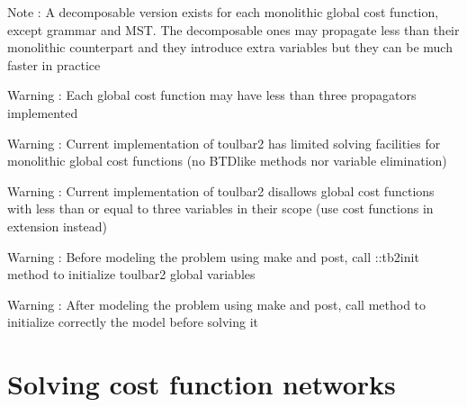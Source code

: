 \documentclass[letterpaper,10pt,openany,oneside,english]{sphinxmanual}
\begin{document}
\begin{fulllineitems}
\sphinxAtStartPar
Note : A decomposable version exists for each monolithic global cost function, except grammar and MST. The decomposable ones may propagate less than their monolithic counterpart and they introduce extra variables but they can be much faster in practice

\sphinxAtStartPar
Warning : Each global cost function may have less than three propagators implemented

\sphinxAtStartPar
Warning : Current implementation of toulbar2 has limited solving facilities for monolithic global cost functions (no BTD\sphinxhyphen{}like methods nor variable elimination)

\sphinxAtStartPar
Warning : Current implementation of toulbar2 disallows global cost functions with less than or equal to three variables in their scope (use cost functions in extension instead)

\sphinxAtStartPar
Warning : Before modeling the problem using make and post, call ::tb2init method to initialize toulbar2 global variables

\sphinxAtStartPar
Warning : After modeling the problem using make and post, call {\hyperref[\detokenize{ref/ref_cpp:classWeightedCSP_1a31a9384d3dabf5388fe610710f2f19e0}]{}} method to initialize correctly the model before solving it 

\end{fulllineitems}



\section{Solving cost function networks}
\label{\detokenize{ref/ref_modules:solving-cost-function-networks}}
\end{document}
